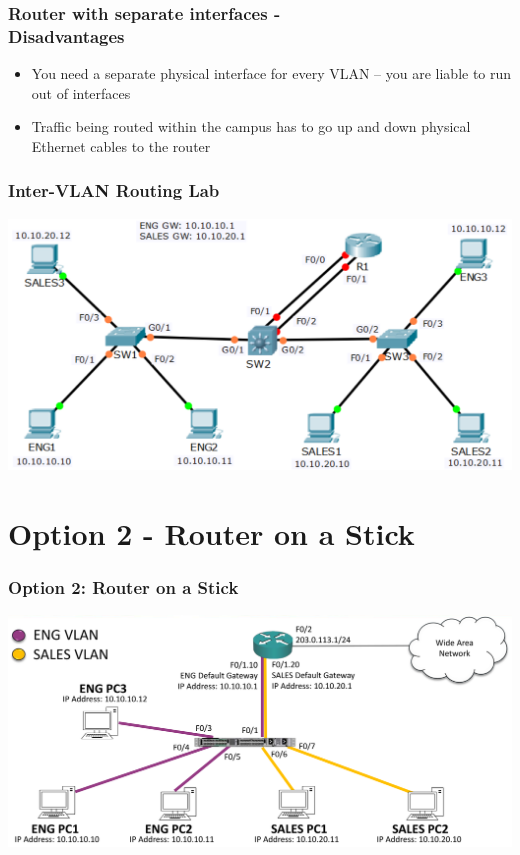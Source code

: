 \documentclass[pdflatex,compress,mathserif]{beamer}
\begin{document}
\begin{frame}
	\frametitle{Router with separate interfaces -\\ Disadvantages}
	\begin{itemize}
		\item You need a separate physical interface for every VLAN – you are liable
to run out of interfaces
		\item Traffic being routed within the campus has to go up and down physical
Ethernet cables to the router
	\end{itemize}
\end{frame}

\begin{frame}
	\frametitle{Inter-VLAN Routing Lab}
	\begin{center}
		\includegraphics[width=\linewidth]{img/img03}
	\end{center}
\end{frame}

\section{Option 2 - Router on a Stick}

\begin{frame}
	\frametitle{Option 2: Router on a Stick}
	\begin{center}
		\includegraphics[width=\linewidth]{img/img04}
	\end{center}
\end{frame}
\end{document}

